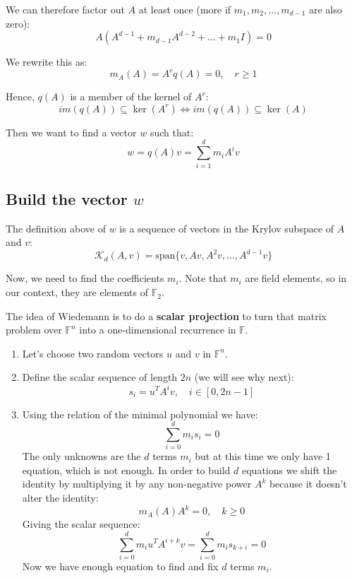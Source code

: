 \documentclass[a4paper, 11pt]{article}
\begin{document}
We can therefore factor out $A$ at least once (more if $m_1, m_2, \dots, m_{d-1}$ are also zero):
\begin{equation}
    A(A^{d-1} + m_{d-1}A^{d-2} + \dots + m_1I) = 0
\end{equation}
 
We rewrite this as:
\begin{equation}
    m_A(A) = A^r q(A) = 0, \quad r \geq 1
\end{equation}

Hence, $q(A)$ is a member of the kernel of $A^r$:
\begin{equation}
    im(q(A)) \subseteq \ker(A^r) \iff im(q(A)) \subseteq \ker(A)
\end{equation}

Then we want to find a vector $w$ such that:
\begin{equation}
    w = q(A)v = \sum^d_{i=1} m_i A^i v
\end{equation}

\subsection{Build the vector $w$}

The definition above of $w$ is a sequence of vectors in the Krylov subspace of $A$ and $v$:
\begin{equation}
    \mathcal{K}_d(A,v) = \mathrm{span}\{v, Av, A^2v, \dots, A^{d-1}v\}
\end{equation}

Now, we need to find the coefficients $m_i$. Note that $m_i$ are field elements, so in our context, they are elements of $\mathbb{F}_2$.

The idea of Wiedemann is to do a \textbf{scalar projection} to turn that matrix problem over $\mathbb{F}^n$ into a one-dimensional recurrence in $\mathbb{F}$.

\begin{enumerate}
    \item Let's choose two random vectors $u$ and $v$ in $\mathbb{F}^{n}$.
    \item Define the scalar sequence of length $2n$ (we will see why next): $$s_i = u^TA^iv, \quad i \in [0, 2n-1]$$
    \item Using the relation of the minimal polynomial we have:
    $$\sum^d_{i=0} m_i s_{i} = 0$$
    The only unknowns are the $d$ terms $m_i$ but at this time we only have 1 equation, which is not enough. In order to build $d$ equations we shift the identity by multiplying it by any non-negative power $A^k$ because it doesn't alter the identity:
    $$m_A(A)A^k=0, \quad k \ge 0$$
    Giving the scalar sequence:
    $$\sum^d_{i=0} m_i u^T A^{i+k}v = \sum^d_{i=0} m_i s_{k+i} = 0$$
    Now we have enough equation to find and fix $d$ terms $m_i$.
\end{enumerate}
\end{document}
